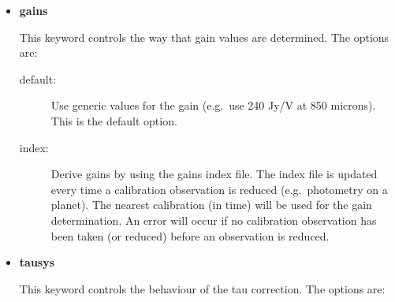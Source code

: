 \documentclass[twoside,11pt]{article}
\renewcommand{\_}{\texttt{\symbol{95}}}
\begin{document}
\begin{itemize}
\item \textbf{gains} \mbox{}

This keyword controls the way that gain values are determined. The options
are:

\begin{description}
\item[default:] Use generic values for the gain (e.g.\ use 240 Jy/V at 850
microns). This is the default option.
\item[index:] Derive gains by using the gains index file. The index file
is updated every time a calibration observation is reduced (e.g.\ photometry
on a planet). The nearest calibration (in
time) will be used for the gain determination. An error will occur if
no calibration observation has been taken (or reduced) before an observation
is reduced.
\end{description}


\item \textbf{tausys} \mbox{}

This keyword controls the behaviour of the tau correction. The options
are:


\end{itemize}
\end{document}
